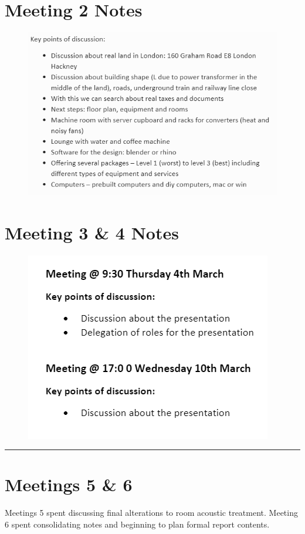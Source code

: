 \documentclass[11pt]{article}
\begin{document}
    \section{Meeting 2 Notes}
        \begin{figure}[H]
            \centering
            \includegraphics[scale=0.6]{resources/M2Notes.png}
        \end{figure}

    \section{Meeting 3 \& 4 Notes}
        \begin{figure}[H]
            \centering
            \includegraphics[scale=1]{resources/lastMeets.png}
        \end{figure}
        \hrule
        \vspace{0.5cm}

    \section{Meetings 5 \& 6}
        Meetings 5  spent discussing final alterations to room acoustic treatment.
        Meeting 6 spent consolidating notes and beginning to plan formal report contents.  
\end{document}
